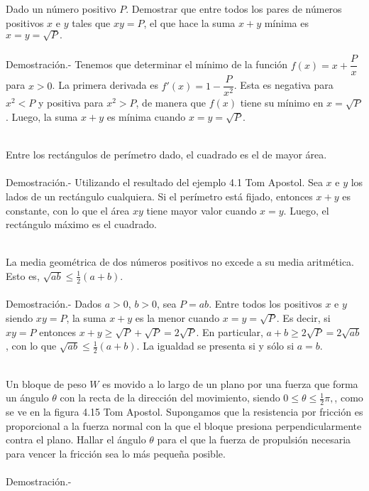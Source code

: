 \begin{ejem}
    Dado un número positivo $P$. Demostrar que entre todos los pares de números positivos $x$ e $y$ tales que $xy=P$, el que hace la suma $x+y$ mínima es $x=y=\sqrt{P}.$\\\\
    Demostración.-\; Tenemos que determinar el mínimo de la función $f(x)=x+\dfrac{P}{x}$ para $x>0$. La primera derivada es $f'(x)=1-\dfrac{P}{x^2}$. Esta es negativa para $x^2<P$ y positiva para $x^2>P$, de manera que $f(x)$ tiene su mínimo en $x=\sqrt{P}$. Luego, la suma $x+y$ es mínima cuando $x=y=\sqrt{P}.$\\\\
\end{ejem}

\begin{ejem}
    Entre los rectángulos de perímetro dado, el cuadrado es el de mayor área.\\\\
	Demostración.-\; Utilizando el resultado del ejemplo 4.1 Tom Apostol. Sea $x$ e $y$ los lados de un rectángulo cualquiera. Si el perímetro está fijado, entonces $x+y$ es constante, con lo que el área $xy$ tiene mayor valor cuando $x=y$. Luego, el rectángulo máximo es el cuadrado.\\\\
\end{ejem}

\begin{ejem}
    La media geométrica de dos números positivos no excede a su media aritmética. Esto es, $\sqrt{ab}\leq \frac{1}{2}(a+b).$\\\\
    Demostración.-\; Dados $a>0$, $b>0$, sea $P=ab$. Entre todos los positivos $x$ e $y$ siendo $xy=P$, la suma $x+y$ es la menor cuando $x=y=\sqrt{P}.$ Es decir, si $xy=P$ entonces $x+y\geq \sqrt{P}+\sqrt{P}=2\sqrt{P}.$ En particular, $a+b\geq 2\sqrt{P}=2\sqrt{ab}$, con lo que $\sqrt{ab}\leq \frac{1}{2}(a+b)$. La igualdad se presenta si y sólo si $a=b.$\\\\
\end{ejem}

\begin{ejem}
    Un bloque de peso $W$ es movido a lo largo de un plano por una fuerza que forma un ángulo $\theta$ con la recta de la dirección del movimiento, siendo $0\leq \theta \leq \frac{1}{2}\pi,$, como se ve en la figura 4.15 Tom Apostol. Supongamos que la resistencia por fricción es proporcional a la fuerza normal con la que el bloque presiona perpendicularmente contra el plano. Hallar el ángulo $\theta$ para el que la fuerza de propulsión necesaria para vencer la fricción sea lo más pequeña posible.\\\\
	Demostración.-\; 
\end{ejem}

